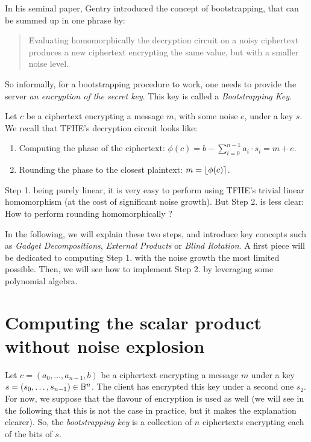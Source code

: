 In his seminal paper, Gentry introduced the concept of bootstrapping, that can be summed up in one phrase by:

\begin{quote}
	Evaluating homomorphically the decryption circuit on a noisy ciphertext produces a new ciphertext encrypting the same value, but with a smaller noise level.
\end{quote}

So informally, for a bootstrapping procedure to work, one needs to provide the server \textit{an encryption of the secret key}. This key is called a \textit{Bootstrapping Key}.



Let $c$ be a ciphertext encrypting a message $m$, with some noise $e$, under a key $s$. We recall that TFHE's decryption circuit looks like:

\begin{enumerate}
	\item Computing the phase of the ciphertext: $\phi(c) = b - \sum_{i=0}^{n-1} a_i \cdot s_i = m + e$.
	\item Rounding the phase to the closest plaintext: $m = \left \lfloor \phi(c) \right \rceil$.
\end{enumerate}


Step 1. being purely linear, it is very easy to perform using TFHE's trivial linear homomorphism (at the cost of significant noise growth). But Step 2. is less clear: How to perform rounding homomorphically ? 

In the following, we will explain these two steps, and introduce key concepts such as \textit{Gadget Decompositions}, \textit{External Products} or \textit{Blind Rotation}. A first piece will be dedicated to computing Step 1. with the noise growth the most limited possible. Then, we will see how to implement Step 2. by leveraging some polynomial algebra.

\section{Computing the scalar product without noise explosion}

Let $c = (a_0, \dots, a_{n-1}, b)$ be a \LWE ciphertext encrypting a message $m$ under a key $s = (s_0, \dots, s_{n-1}) \in \mathbb{B}^n$. The client has encrypted this key under a second one $s_2$. For now, we suppose that the \LWE flavour of encryption is used as well (we will see in the following that this is not the case in practice, but it makes the explanation clearer). So, the \textit{bootstrapping key} is a collection of $n$ ciphertexts encrypting each of the bits of $s$.

